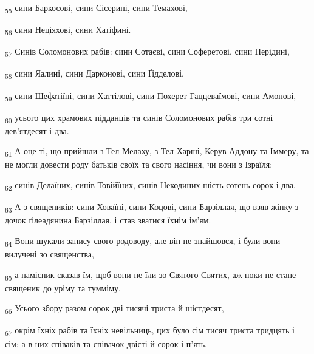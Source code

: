 \begin{tcolorbox}
\textsubscript{55} сини Баркосові, сини Сісерині, сини Темахові,
\end{tcolorbox}
\begin{tcolorbox}
\textsubscript{56} сини Неціяхові, сини Хатіфині.
\end{tcolorbox}
\begin{tcolorbox}
\textsubscript{57} Синів Соломонових рабів: сини Сотаєві, сини Соферетові, сини Перідині,
\end{tcolorbox}
\begin{tcolorbox}
\textsubscript{58} сини Яалині, сини Дарконові, сини Ґідделові,
\end{tcolorbox}
\begin{tcolorbox}
\textsubscript{59} сини Шефатіїні, сини Хаттілові, сини Похерет-Гаццеваїмові, сини Амонові,
\end{tcolorbox}
\begin{tcolorbox}
\textsubscript{60} усього цих храмових підданців та синів Соломонових рабів три сотні дев'ятдесят і два.
\end{tcolorbox}
\begin{tcolorbox}
\textsubscript{61} А оце ті, що прийшли з Тел-Мелаху, з Тел-Харші, Керув-Аддону та Іммеру, та не могли довести роду батьків своїх та свого насіння, чи вони з Ізраїля:
\end{tcolorbox}
\begin{tcolorbox}
\textsubscript{62} синів Делаїних, синів Товійїних, синів Некодиних шість сотень сорок і два.
\end{tcolorbox}
\begin{tcolorbox}
\textsubscript{63} А з священиків: сини Ховаїні, сини Коцові, сини Барзіллая, що взяв жінку з дочок ґілеадянина Барзіллая, і став зватися їхнім ім'ям.
\end{tcolorbox}
\begin{tcolorbox}
\textsubscript{64} Вони шукали запису свого родоводу, але він не знайшовся, і були вони вилучені зо священства,
\end{tcolorbox}
\begin{tcolorbox}
\textsubscript{65} а намісник сказав їм, щоб вони не їли зо Святого Святих, аж поки не стане священик до уріму та тумміму.
\end{tcolorbox}
\begin{tcolorbox}
\textsubscript{66} Усього збору разом сорок дві тисячі триста й шістдесят,
\end{tcolorbox}
\begin{tcolorbox}
\textsubscript{67} окрім їхніх рабів та їхніх невільниць, цих було сім тисяч триста тридцять і сім; а в них співаків та співачок двісті й сорок і п'ять.
\end{tcolorbox}

